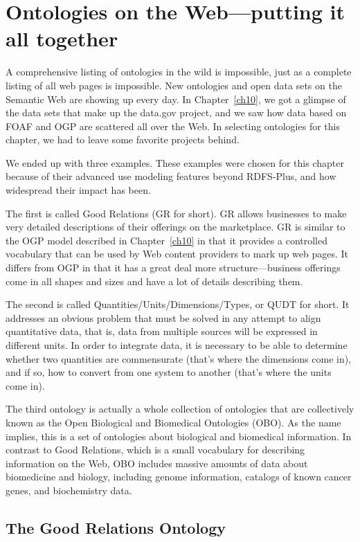 \chapter{Ontologies on the Web---putting it all together}
\label{ch14}

A comprehensive listing of ontologies in the wild is impossible, just as
a complete listing of all web pages is impossible. New ontologies and
open data sets on the Semantic Web are showing up every day. In Chapter~\ref{ch10}, we got a glimpse of the data sets that make up the data.gov project,
and we saw how data based on FOAF and OGP are scattered all over the
Web. In selecting ontologies for this chapter, we had to leave some
favorite projects behind.

We ended up with three examples. These examples were chosen for this
chapter because of their advanced use modeling features beyond
RDFS-Plus, and how widespread their impact has been.

The first is called Good Relations (GR for short). GR allows businesses
to make very detailed descriptions of their offerings on the
marketplace. GR is similar to the OGP model described in Chapter~\ref{ch10} in
that it provides a controlled vocabulary that can be used by Web content
providers to mark up web pages. It differs from OGP in that it has a
great deal more structure---business offerings come in all shapes and
sizes and have a lot of details describing them.

The second is called Quantities/Units/Dimensions/Types, or QUDT for
short. It addresses an obvious problem that must be solved in any
attempt to align quantitative data, that is, data from
multiple sources will be expressed in different units. In order to
integrate data, it is necessary to be able to determine whether two
quantities are commensurate (that's where the dimensions come in), and
if so, how to convert from one system to another (that's where the units
come in).

The third ontology is actually a whole collection of ontologies that are
collectively known as the Open Biological and Biomedical Ontologies
(OBO). As the name implies, this is a set of ontologies about biological
and biomedical information. In contrast to Good Relations, which is a
small vocabulary for describing information on the Web, OBO includes
massive amounts of data about biomedicine and biology, including genome
information, catalogs of known cancer genes, and biochemistry data.

\section{The Good Relations Ontology}

